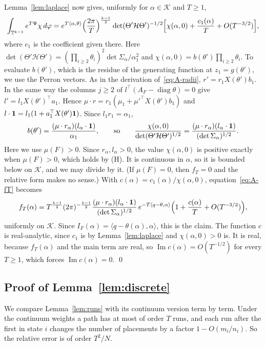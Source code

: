 Lemma~\ref{lem:laplace} now gives, uniformly for $\alpha\in\mathcal K$ and
$T\ge1$,
\[
\int_{\mathbb T^{k-1}}e^{T\Psi}\chi\,d\varphi
=e^{T\langle\alpha,\theta\rangle}\Bigl(\frac{2\pi}T\Bigr)^{\frac{k-1}2}
\det(\Theta'\mathcal H\Theta')^{-1/2}
\Bigl[\chi(\alpha,0)+\frac{c_1(\alpha)}T+O(T^{-3/2})\Bigr],
\]
where $c_1$ is the coefficient given there. Here
$\det(\Theta'\mathcal H\Theta')=(\prod_{i\ge2}\theta_i)^2\det\Sigma_\alpha/\alpha_1^2$
and $\chi(\alpha,0)=b(\theta')\prod_{i\ge2}\theta_i$. To evaluate
$b(\theta')$, which is the residue of the generating function at
$z_1=g(\theta')$, we use the Perron vectors. As in the derivation
of~\eqref{eq:A-radii}, $r'=r_1X(\theta')b_1$. In the same way the columns
$j\ge2$ of $l^\top(A_F-\operatorname{diag}\theta)=0$ give
$l'=l_1X(\theta')^\top a_1$. Hence $\mu\cdot r=r_1(\mu_1+\mu'^\top X(\theta')b_1)$
and $l\cdot\mathbf{1}=l_1(1+a_1^\top X(\theta')\mathbf{1})$. Since $l_1r_1=\alpha_1$,
\[
b(\theta')=\frac{(\mu\cdot r_\alpha)(l_\alpha\cdot\mathbf{1})}{\alpha_1},
\qquad\text{so}\qquad
\frac{\chi(\alpha,0)}{\det(\Theta'\mathcal H\Theta')^{1/2}}
=\frac{(\mu\cdot r_\alpha)(l_\alpha\cdot\mathbf{1})}{(\det\Sigma_\alpha)^{1/2}} .
\]
Here we use $\mu(F)>0$. Since $r_\alpha,l_\alpha>0$, the value
$\chi(\alpha,0)$ is positive exactly when $\mu(F)>0$, which holds by
\textup{(H)}. It is continuous in $\alpha$, so it is bounded below on
$\mathcal K$, and we may divide by it. (If $\mu(F)=0$, then $f_T=0$ and the
relative form makes no sense.) With $c(\alpha)=c_1(\alpha)/\chi(\alpha,0)$,
equation~\eqref{eq:A-fT} becomes
\[
f_T(\alpha)=T^{\frac{k-1}2}(2\pi)^{-\frac{k-1}2}
\frac{(\mu\cdot r_\alpha)(l_\alpha\cdot\mathbf{1})}{(\det\Sigma_\alpha)^{1/2}}\,
e^{-T\langle q-\theta,\alpha\rangle}\Bigl(1+\frac{c(\alpha)}T+O(T^{-3/2})\Bigr),
\]
uniformly on $\mathcal K$. Since $I_F(\alpha)=\langle q-\theta(\alpha),\alpha\rangle$,
this is the claim. The function $c$ is real-analytic, since $c_1$ is by
Lemma~\ref{lem:laplace} and $\chi(\alpha,0)>0$ is. It is real, because
$f_T(\alpha)$ and the main term are real, so
$\operatorname{Im}c(\alpha)=O(T^{-1/2})$ for every $T\ge1$, which forces
$\operatorname{Im}c(\alpha)=0$. \qed

\subsection{Proof of Lemma~\texorpdfstring{\ref{lem:discrete}}{4.4}}

We compare Lemma~\ref{lem:runs} with its continuum version term by term. Under the continuum weights a path has at most of order $T$ runs,
and each run after the first in state $i$ changes the number of placements by
a factor $1-O(m_i/n_i)$. So the relative error is of order $T^2/N$.

